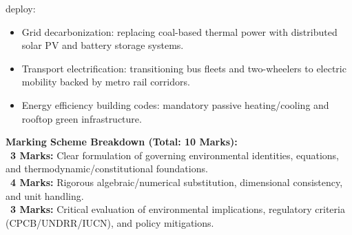 \begin{solbox}
deploy:\begin{itemize}[leftmargin=1.5em]  \item Grid decarbonization: replacing coal-based thermal power with distributed solar PV and battery storage systems.  \item Transport electrification: transitioning bus fleets and two-wheelers to electric mobility backed by metro rail corridors.  \item Energy efficiency building codes: mandatory passive heating/cooling and rooftop green infrastructure.\end{itemize}
\end{solbox}

\begin{examinertip}
\textbf{Marking Scheme Breakdown (Total: 10 Marks):}\\
\textbullet\ \textbf{3 Marks:} Clear formulation of governing environmental identities, equations, and thermodynamic/constitutional foundations.\\
\textbullet\ \textbf{4 Marks:} Rigorous algebraic/numerical substitution, dimensional consistency, and unit handling.\\
\textbullet\ \textbf{3 Marks:} Critical evaluation of environmental implications, regulatory criteria (CPCB/UNDRR/IUCN), and policy mitigations.
\end{examinertip}
